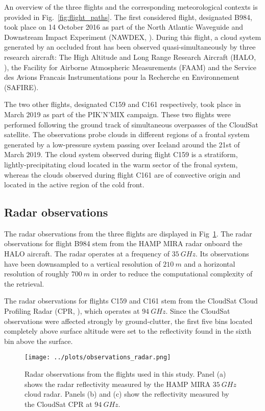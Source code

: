 \documentclass[journal abbreviation, manuscript]{copernicus}
\begin{document}
An overview of the three flights and the corresponding meteorological contexts
is provided in Fig.~\ref{fig:flight_paths}. The first considered flight,
designated B984, took place on 14 October 2016 as part of the North Atlantic
Waveguide and Downstream Impact Experiment (NAWDEX, \citet{schafler18}). During
this flight, a cloud system generated by an occluded front has been observed
quasi-simultaneously by three research aircraft: The High Altitude and Long
Range Research Aircraft (HALO, \citet{krautstrunk12}), the Facility for Airborne
Atmospheric Measurements (FAAM) and the Service des Avions Francais
Instrumentations pour la Recherche en Environnement (SAFIRE).

The two other flights, designated C159 and C161 respectively, took place in
March 2019 as part of the PIK'N'MIX campaign. These two flights were performed
following the ground track of simultaneous overpasses of the CloudSat satellite.
The observations probe clouds in different regions of a frontal system generated
by a low-pressure system passing over Iceland around the 21st of March 2019. The
cloud system observed during flight C159 is a stratiform, lightly-precipitating
cloud located in the warm sector of the fronal system, whereas the clouds
observed during flight C161 are of convective origin and located in the active
region of the cold front.


\subsection{Radar observations}

The radar observations from the three flights are displayed in
Fig~\ref{fig:observations_radar}. The radar observations for flight B984 stem
from the HAMP MIRA radar \citep{ewald19} onboard the HALO aircraft. The radar
operates at a frequency of $35\ \unit{GHz}$. Its observations have been
downsampled to a vertical resolution of $210\ \unit{m}$ and a horizontal
resolution of roughly $700\ \unit{m}$ in order to reduce the computational
complexity of the retrieval.

The radar observations for flights C159 and C161 stem from the CloudSat Cloud
Profiling Radar (CPR, \citet{tanelli08}), which operates at $94\ \unit{GHz}$.
Since the CloudSat observations were affected  strongly by ground-clutter,
the first five bins located completely above surface altitude were set to the
reflectivity found in the sixth bin above the surface.

\begin{figure}[h!]
  \centering
  \texttt{[image: ../plots/observations\_radar.png]}
  \caption{Radar observations from the flights used in this study. Panel (a)
    shows the radar reflectivity measured by the HAMP MIRA $35\ \unit{GHz}$
    cloud radar. Panels (b) and (c) show the reflectivity measured by the
    CloudSat CPR at $94\ \unit{GHz}$.}
  \label{fig:observations_radar}
\end{figure}
\end{document}
